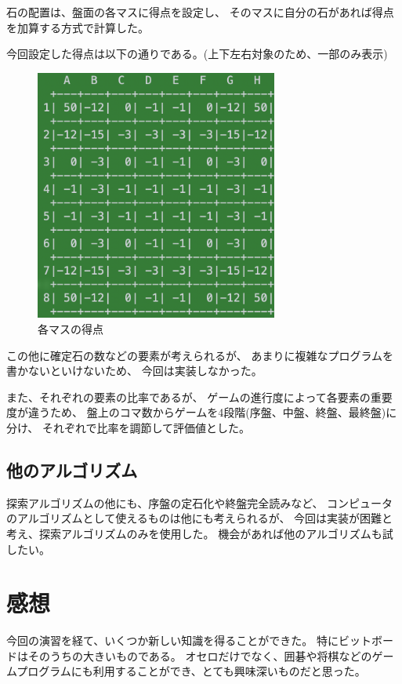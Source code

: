 \documentclass{jsarticle}
\begin{document}
        石の配置は、盤面の各マスに得点を設定し、
        そのマスに自分の石があれば得点を加算する方式で計算した。

        今回設定した得点は以下の通りである。(上下左右対象のため、一部のみ表示)

        \begin{figure}[h]
            \centering
            \includegraphics[width=8cm]{board_point.png}
            \cprotect\caption{各マスの得点}
        \end{figure}

        この他に確定石の数などの要素が考えられるが、
        あまりに複雑なプログラムを書かないといけないため、
        今回は実装しなかった。

        また、それぞれの要素の比率であるが、
        ゲームの進行度によって各要素の重要度が違うため、
        盤上のコマ数からゲームを4段階(序盤、中盤、終盤、最終盤)に分け、
        それぞれで比率を調節して評価値とした。

    \subsection{他のアルゴリズム}
        探索アルゴリズムの他にも、序盤の定石化や終盤完全読みなど、
        コンピュータのアルゴリズムとして使えるものは他にも考えられるが、
        今回は実装が困難と考え、探索アルゴリズムのみを使用した。
        機会があれば他のアルゴリズムも試したい。

\section{感想}
    今回の演習を経て、いくつか新しい知識を得ることができた。
    特にビットボードはそのうちの大きいものである。
    オセロだけでなく、囲碁や将棋などのゲームプログラムにも利用することができ、とても興味深いものだと思った。
\end{document}
